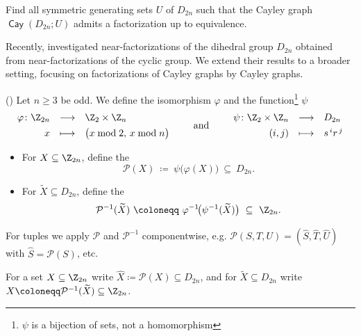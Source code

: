 \documentclass{file}
\newcommand{\cay}{\mathop{\mathsf{Cay}}}
\begin{document}
\begin{op}
Find all symmetric generating sets $U$ of $D_{2n}$ such that the Cayley graph $\cay(D_{2n};U)$ admits a factorization up to equivalence.
\end{op}

Recently, \citet{KreherPatersonStinson2025} investigated near-factorizations of the dihedral group 
$D_{2n}$ obtained from near-factorizations of the cyclic group.
We extend their results to a broader setting, focusing on factorizations of Cayley graphs by Cayley graphs.

\begin{defn}({\rm\citet{KreherPatersonStinson2025}})\label{def:Pecher}
Let $n\ge 3$ be odd. 
We define the isomorphism $\varphi$ and the function\footnote{$\psi$ is a bijection of sets, not a homomorphism} $\psi$ \[ \begin{array}{rcl} \varphi \colon \Z_{2n} &\longrightarrow& \Z_2 \times \Z_n \\[4pt] x &\longmapsto& \bigl(x \bmod 2,\, x \bmod n\bigr) \end{array} \qquad\text{and}\qquad \begin{array}{rcl} \psi \colon \Z_2 \times \Z_n &\longrightarrow& D_{2n} \\[4pt] (i,j) &\longmapsto& s^{\,i} r^{\,j} \end{array} \]
\begin{itemize}
\item For $X\subseteq \Z_{2n}$, define the 
\[
\mathcal P(X)\ \coloneqq \ \psi\bigl(\varphi(X)\bigr)\ \subseteq\ D_{2n}.
\]
\item For $\widetilde X\subseteq D_{2n}$, define the 
\[
\mathcal P^{-1}(\widetilde X)\ \coloneqq \ \varphi^{-1}\!\bigl(\psi^{-1}(\widetilde X)\bigr)\ \subseteq\ \Z_{2n}.
\]
\end{itemize}
For tuples we apply $\mathcal P$ and $\mathcal P^{-1}$ componentwise, e.g.
$\mathcal P(S,T,U)=(\widehat S,\widehat T,\widehat U)$ with $\widehat S=\mathcal P(S)$, etc.
\end{defn}

\begin{nota}
For a set $X\subseteq\Z_{2n}$ write
$\widehat X\coloneqq \mathcal P(X)\subseteq D_{2n}$, and for $\widetilde X\subseteq D_{2n}$ write
$X\coloneqq \mathcal P^{-1}(\widetilde X)\subseteq\Z_{2n}$.
\end{nota}
\end{document}
